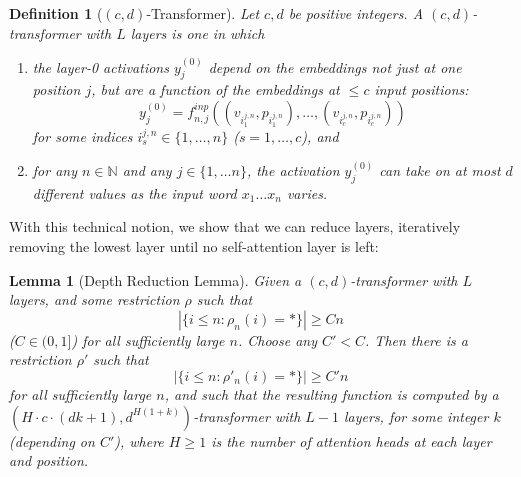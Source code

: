 \documentclass[11pt,a4paper]{article}
\newcounter{theorem}
\newtheorem{defin}[theorem]{Definition}
\newtheorem{lemma}[theorem]{Lemma}
\begin{document}
\begin{defin}[$(c,d)$-Transformer]
Let $c,d$ be positive integers. A $(c,d)$-transformer with $L$ layers is one in which
\begin{enumerate}
    \item the layer-0 activations $y_j^{(0)}$ depend on the embeddings not just at one position $j$, but are a function of the embeddings at $\leq c$ input positions:
\begin{equation}
    y_j^{(0)} = f^{inp}_{n,j}((v_{i_1^{j,n}}, p_{i_1^{j,n}}), \dots, (v_{i_c^{j,n}}, p_{i_c^{j,n}} ))
\end{equation}
for some indices ${i_s^{j,n}} \in \{1, \dots, n\}$ ($s = 1, \dots, c$), and 
\item for any $n \in \mathbb{N}$ and any $j \in \{1, \dots n\}$, the activation $y_j^{(0)}$ can take on at most $d$ different values as the input word $x_1\dots x_n$ varies.
\end{enumerate}
\end{defin}


With this technical notion, we show that we can reduce layers, iteratively removing the lowest layer until no self-attention layer is left:

\begin{lemma}[Depth Reduction Lemma]\label{lemma:depth-red}
Given a $(c,d)$-transformer with $L$ layers, and some restriction $\rho$ such that
\begin{equation}
|\{i \leq n: \rho_n(i) = *\}| \geq Cn
\end{equation}
($C \in (0,1]$)
for all sufficiently large $n$.
Choose any $C' < C$.
Then there is a restriction $\rho'$ 
such that
\begin{equation}
|\{i \leq n: \rho'_n(i) = *\}| \geq C'n
\end{equation}
for all sufficiently large $n$, 
and such that the resulting function is computed by a $(H\cdot c\cdot(dk+1), d^{H(1+k)})$-transformer with $L-1$ layers, for some integer $k$ (depending on $C'$), where $H \geq 1$ is the number of attention heads at each layer and position.
\end{lemma}
\end{document}
